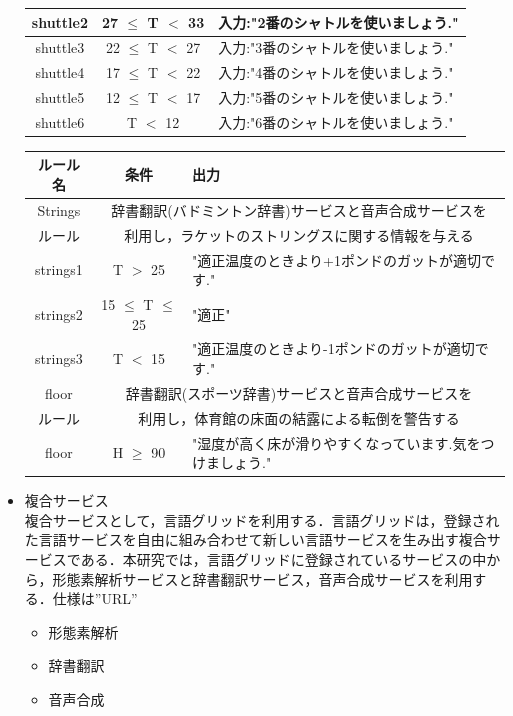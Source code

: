 \documentclass{kuisthesis}			%
\begin{document}
\begin{itemize}
\begin{table}[p]
\begin{center}
\begin{tabularx}{\linewidth}{|c|c|X|}
      shuttle2 & 27 $\leq$ T $<$ 33 & 入力:"2番のシャトルを使いましょう."  \\ \hline
      shuttle3 & 22 $\leq$ T $<$ 27& 入力:"3番のシャトルを使いましょう."  \\ \hline
      shuttle4 & 17 $\leq$ T $<$ 22 & 入力:"4番のシャトルを使いましょう."  \\ \hline
      shuttle5 & 12 $\leq$ T $<$ 17 & 入力:"5番のシャトルを使いましょう."  \\ \hline
      shuttle6 & T $<$ 12 & 入力:"6番のシャトルを使いましょう." \\ \hline \hline
    \end{tabularx}
    \label{tab:drl}
  \end{center}
\end{table}

\begin{table}[htb]
    \begin{tabularx}{\linewidth}{|c|c|X|} \hline
      ルール名 & 条件 & 出力 \\ \hline \hline
      Strings & \multicolumn{2}{c|}{辞書翻訳(バドミントン辞書)サービスと音声合成サービスを} \\
      ルール & \multicolumn{2}{c|}{利用し，ラケットのストリングスに関する情報を与える} \\ \hline \hline
      strings1 & T $>$ 25 & "適正温度のときより+1ポンドのガットが適切です."  \\ \hline
      strings2 & 15 $\leq$ T $\leq$ 25 & "適正" \\ \hline
      strings3 & T $<$ 15 & "適正温度のときより-1ポンドのガットが適切です." \\ \hline
      floor & \multicolumn{2}{c|}{辞書翻訳(スポーツ辞書)サービスと音声合成サービスを} \\
      ルール & \multicolumn{2}{c|}{利用し，体育館の床面の結露による転倒を警告する} \\ \hline \hline
      floor & H $\geq$ 90 & "湿度が高く床が滑りやすくなっています.気をつけましょう." \\ \hline
    \end{tabularx}
\end{table}


\item 複合サービス\\
複合サービスとして，言語グリッドを利用する．言語グリッドは，登録された言語サービスを自由に組み合わせて新しい言語サービスを生み出す複合サービスである．本研究では，言語グリッドに登録されているサービスの中から，形態素解析サービスと辞書翻訳サービス，音声合成サービスを利用する．仕様は”URL”
\begin{itemize}
\item 形態素解析
\item 辞書翻訳
\item 音声合成
\end{itemize}
\end{itemize}
\end{document}
